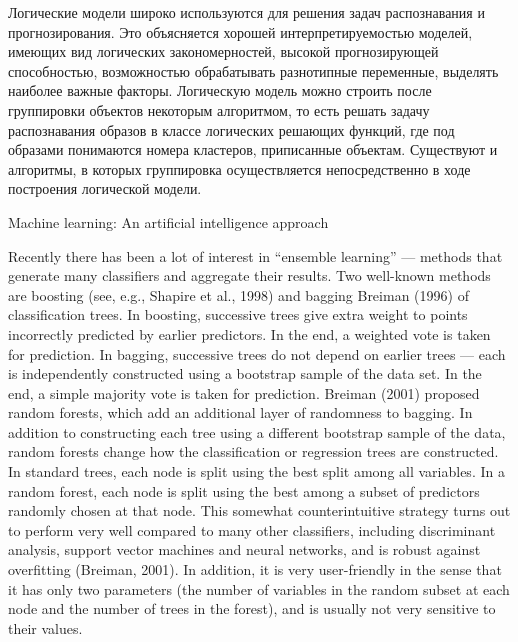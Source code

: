 Логические модели широко используются \cite{бериков2008современные} для решения задач распознавания и прогнозирования. Это объясняется хорошей интерпретируемостью моделей, имеющих вид логических закономерностей, высокой прогнозирующей способностью, возможностью обрабатывать разнотипные переменные, выделять наиболее важные факторы. Логическую модель можно строить после группировки объектов некоторым алгоритмом, то есть решать задачу распознавания образов в классе логических решающих функций, где под образами понимаются номера кластеров, приписанные объектам. Существуют и алгоритмы, в которых группировка осуществляется непосредственно в ходе построения логической модели. 

Machine learning: An artificial intelligence approach\cite{michalski2013machine}

Recently there has been a lot of interest in “ensemble learning” — methods that generate many classifiers and aggregate their results. Two well-known methods are boosting (see, e.g., Shapire et al., 1998) and bagging Breiman (1996) of classification trees. In boosting, successive trees give extra weight to points incorrectly predicted by earlier predictors. In the end, a weighted vote is taken for prediction. In bagging, successive trees do not depend on earlier trees — each is independently constructed using a bootstrap sample of the data set. In the end, a simple majority vote is taken for prediction. Breiman (2001) proposed random forests, which add an additional layer of randomness to bagging. In addition to constructing each tree using a different bootstrap sample of the data, random forests change how the classification or regression trees are constructed. In standard trees, each node is split using the best split among all variables. In a random forest, each node is split using the best among a subset of predictors randomly chosen at that node. This somewhat counterintuitive strategy turns out to perform very well compared to many other classifiers, including discriminant analysis, support vector machines and neural networks, and is robust against overfitting (Breiman, 2001). In addition, it is very user-friendly in the sense that it has only two parameters (the number of variables in the random subset at each node and the number of trees in the forest), and is usually not very sensitive to their values. \cite{liaw2002classification}


